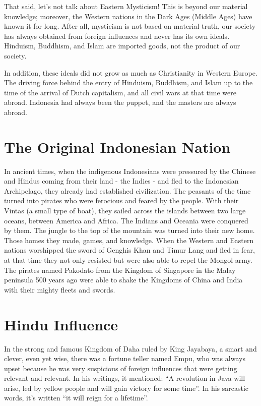 That said, let's not talk about Eastern Mysticism! This is beyond our material knowledge; moreover, 
the Western nations in the Dark Ages (Middle Ages) have known it for long. After all, mysticism is 
not based on material truth, our society has always obtained from foreign influences and never has 
its own ideals. Hinduism, Buddhism, and Islam are imported goods, not the product of our society.\vskip 0.2in

In addition, these ideals did not grow as much as Christianity in Western Europe. 
The driving force behind the entry of Hinduism, Buddhism, and Islam up to the time of 
the arrival of Dutch capitalism, and all civil wars at that time were abroad. Indonesia 
had always been the puppet, and the masters are always abroad.

\section{The Original Indonesian Nation}

In ancient times, when the indigenous Indonesians were 
pressured by the Chinese and Hindus coming from their land - the Indies - and 
fled to the Indonesian Archipelago, they already had established civilization. 
The peasants of the time turned into pirates who were ferocious and feared by the people. 
With their Vintas (a small type of boat), they sailed across the islands between two large 
oceans, between America and Africa. The Indians and Oceania were conquered by them. The jungle 
to the top of the mountain was turned into their new home. Those homes they made, games, 
and knowledge. When the Western and Eastern nations worshipped the sword of Genghis Khan and 
Timur Lang and fled in fear, at that time they not only resisted but were also able to repel 
the Mongol army. The pirates named Pakodato from the Kingdom of Singapore in the Malay peninsula 
500 years ago were able to shake the Kingdoms of China and India with their mighty fleets and swords.

\section{Hindu Influence}

In the strong and famous Kingdom of Daha ruled by King Jayabaya, a smart and clever, 
even yet wise, there was a fortune teller named Empu, who was always upset because he 
was very suspicious of foreign influences that were getting relevant and relevant. 
In his writings, it mentioned: “A revolution in Java will arise, led 
by yellow people and will gain victory for some time”. In his sarcastic 
words, it's written “it will reign for a lifetime”.\vskip 0.2in

